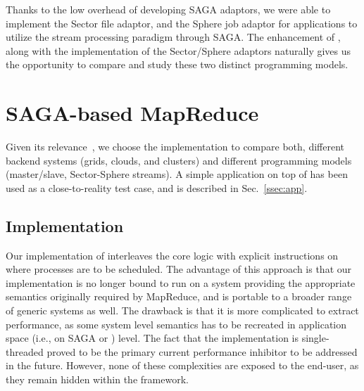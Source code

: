 \documentclass[3p,twocolumn]{elsarticle}
\begin{document}

Thanks to the low overhead of developing SAGA adaptors, we were able
to implement the Sector file adaptor, and the Sphere job adaptor for
applications to utilize the stream processing paradigm through SAGA.
The enhancement of \sagamapreduce, along with the implementation of the
Sector/Sphere adaptors naturally gives us the opportunity to compare
and study these two distinct programming models.


\section{SAGA-based MapReduce}
\label{sec:mr}

 Given its relevance~\cite{saga_ccgrid09}, we choose the \smr
 implementation to compare both, different backend systems (grids,
 clouds, and clusters) and different programming models (master/slave,
 Sector-Sphere streams).   A simple \wc application on top of
 \smr has been used as a close-to-reality test case, and is
 described in Sec.~\ref{ssec:app}.


\subsection{\sagamapreduce Implementation}

Our implementation of \sagamapreduce interleaves the core \mr logic
with explicit instructions on where processes are to be scheduled.
The advantage of this approach is that our implementation is no longer
bound to run on a system providing the appropriate semantics
originally required by MapReduce, and is portable to a broader range
of generic systems as well.  The drawback is that it is more
complicated to extract performance, as some system level semantics has
to be recreated in application space (i.e., on SAGA or \smr) level.
The fact that the implementation is single-threaded proved to be the
primary current performance inhibitor to be addressed in the future.  However, none of these
complexities are exposed to the end-user, as they remain hidden within
the framework.
\end{document}
